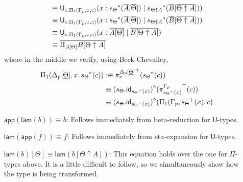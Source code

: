 \documentclass[10pt]{article}
\theoremstyle{definition}
\newcommand\U[3]{\ensuremath{\mathsf{U}_{#1}(#2 \mid #3)}}
\newcommand\UE[2]{\ensuremath{#1(#2)}}
\newcommand\UI[2]{\ensuremath{\lambda #1.#2}}
\newcommand\St[2]{\ensuremath{{#1}^*(#2)}}
\newcommand\TrPlus[2]{\ensuremath{{#1}^+(#2)}}
\newcommand\TrCirc[2]{\ensuremath{{#1}^\circ(#2)}}
\newcommand{\id}{\mathsf{id}}
\begin{document}
\begin{enumerate}[style = multiline, labelwidth = 80pt]
\begin{align*}
&\equiv \U{c.\Pi_1(\asdep{\Gamma},x,c)}{x : \St{s_\Theta}{\upstairs{A}[\upstairs{\Theta}]}}{\St{s_{\Theta \uparrow A}}{\upstairs{B}[\upstairs{\Theta \uparrow A}]}} \\
&\equiv \U{c.\Pi_1(\asdep{\Gamma},x,c)}{x : \St{s_\Theta}{\upstairs{A}[\upstairs{\Theta}]}}{\St{s_{\Theta \uparrow A}}{\upstairs{B}[\upstairs{\Theta \uparrow A}]}} \\
&\equiv \U{c.\Pi_1(\asdep{\Gamma},x,c)}{x : \upstairs{A[\Theta]}}{\upstairs{B[\Theta \uparrow A]}} \\
&\equiv \upstairs{\Pi_{A[\Theta]} B[\Theta \uparrow A]}
\end{align*}
where in the middle we verify, using Beck-Chevalley, 
\begin{align*}
\Pi_1(\asdep{\Delta}[\downstairs{\Theta}],x,\TrCirc{s_{\Theta}}{c})
&:\equiv \TrPlus{\pi^{\asdep{\Delta}[\downstairs{\Theta}]}_x}{\TrCirc{s_{\Theta}}{c}} \\
&\equiv \TrCirc{(s_{\Theta} . \id_{\TrPlus{s_\Theta}{x}})}{\TrPlus{\pi^{\asdep{\Gamma}}_{\TrPlus{s_\Theta}{x}}}{c}} \\
&\equiv \TrCirc{(s_{\Theta} . \id_{\TrPlus{s_\Theta}{x}})}{\Pi_1(\asdep{\Gamma},\TrPlus{s_\Theta}{x},c}
\end{align*}

\item[{$\mathsf{app}(\mathsf{lam}(b)) \equiv b$}:] Follows immediately from beta-reduction for $\mathsf{U}$-types.
\item[{$\mathsf{lam}(\mathsf{app}(f)) \equiv f$}:] Follows immediately from eta-expansion for $\mathsf{U}$-types.

\item[{$\mathsf{lam}(b)[\Theta] \equiv \mathsf{lam}(b[\Theta \uparrow A])$}:] This equation holds over the one for $\Pi$-types above. It is a little difficult to follow, so we simultaneously show how the type is being transformed.


\end{enumerate}
\end{document}

